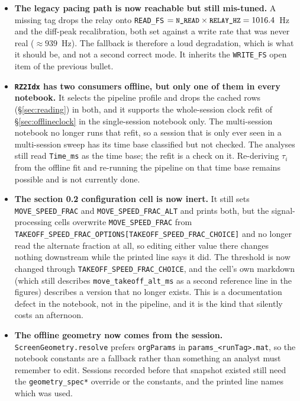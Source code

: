 \documentclass[11pt,a4paper]{article}
\newcommand{\code}[1]{\texttt{\small #1}}
\begin{document}
\begin{itemize}[leftmargin=*,itemsep=5pt]
\item \textbf{The legacy pacing path is now reachable but still mis-tuned.} A
missing tag drops the relay onto \code{READ\_FS} $= \code{N\_READ} \times
\code{RELAY\_HZ} = 1016.4$~Hz and the diff-peak recalibration, both set against
a write rate that was never real ($\approx 939$~Hz). The fallback is therefore a
loud degradation, which is what it should be, and not a second correct mode. It
inherits the \code{WRITE\_FS} open item of the previous bullet.

\item \textbf{\code{RZ2Idx} has two consumers offline, but only one of them in
every notebook.} It selects the pipeline profile and drops the cached rows
(\S\ref{sec:reading}) in both, and it supports the whole-session clock refit of
\S\ref{sec:offlineclock} in the single-session notebook only. The multi-session
notebook no longer runs that refit, so a session that is only ever seen in a
multi-session sweep has its time base classified but not checked. The analyses
still read \code{Time\_ms} as the time base; the refit is a check on it.
Re-deriving $\tau_i$ from the offline fit and re-running the pipeline on that
time base remains possible and is not currently done.

\item \textbf{The section 0.2 configuration cell is now inert.} It still sets
\code{MOVE\_SPEED\_FRAC} and \code{MOVE\_SPEED\_FRAC\_ALT} and prints both, but
the signal-processing cells overwrite \code{MOVE\_SPEED\_FRAC} from
\code{TAKEOFF\_SPEED\_FRAC\_OPTIONS[TAKEOFF\_SPEED\_FRAC\_CHOICE]} and no longer
read the alternate fraction at all, so editing either value there changes
nothing downstream while the printed line says it did. The threshold is now
changed through \code{TAKEOFF\_SPEED\_FRAC\_CHOICE}, and the cell's own markdown
(which still describes \code{move\_takeoff\_alt\_ms} as a second reference line
in the figures) describes a version that no longer exists. This is a
documentation defect in the notebook, not in the pipeline, and it is the kind
that silently costs an afternoon.

\item \textbf{The offline geometry now comes from the session.}
\code{ScreenGeometry.resolve} prefers \code{orgParams} in
\code{params\_<runTag>.mat}, so the notebook constants are a fallback rather
than something an analyst must remember to edit. Sessions recorded before that
snapshot existed still need the \code{geometry\_spec*} override or the
constants, and the printed line names which was used.


\end{itemize}
\end{document}
